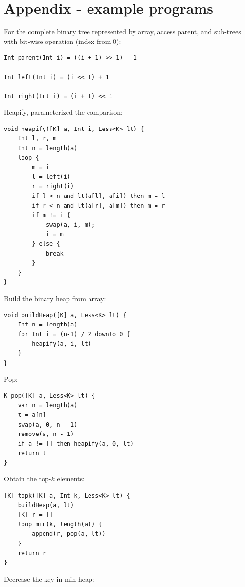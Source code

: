 \documentclass[b5paper]{article}
\begin{document}
\section{Appendix - example programs}

For the complete binary tree represented by array, access parent, and sub-trees with bit-wise operation (index from 0):

\begin{lstlisting}[language = Bourbaki]
Int parent(Int i) = ((i + 1) >> 1) - 1

Int left(Int i) = (i << 1) + 1

Int right(Int i) = (i + 1) << 1
\end{lstlisting}

Heapify, parameterized the comparison:

\begin{lstlisting}[language = Bourbaki]
void heapify([K] a, Int i, Less<K> lt) {
    Int l, r, m
    Int n = length(a)
    loop {
        m = i
        l = left(i)
        r = right(i)
        if l < n and lt(a[l], a[i]) then m = l
        if r < n and lt(a[r], a[m]) then m = r
        if m != i {
            swap(a, i, m);
            i = m
        } else {
            break
        }
    }
}
\end{lstlisting}

Build the binary heap from array:

\begin{lstlisting}[language = Bourbaki]
void buildHeap([K] a, Less<K> lt) {
    Int n = length(a)
    for Int i = (n-1) / 2 downto 0 {
        heapify(a, i, lt)
    }
}
\end{lstlisting}

Pop:

\begin{lstlisting}[language = Bourbaki]
K pop([K] a, Less<K> lt) {
    var n = length(a)
    t = a[n]
    swap(a, 0, n - 1)
    remove(a, n - 1)
    if a != [] then heapify(a, 0, lt)
    return t
}
\end{lstlisting}

Obtain the top-$k$ elements:

\begin{lstlisting}[language = Bourbaki]
[K] topk([K] a, Int k, Less<K> lt) {
    buildHeap(a, lt)
    [K] r = []
    loop min(k, length(a)) {
        append(r, pop(a, lt))
    }
    return r
}
\end{lstlisting}

Decrease the key in min-heap:
\end{document}

